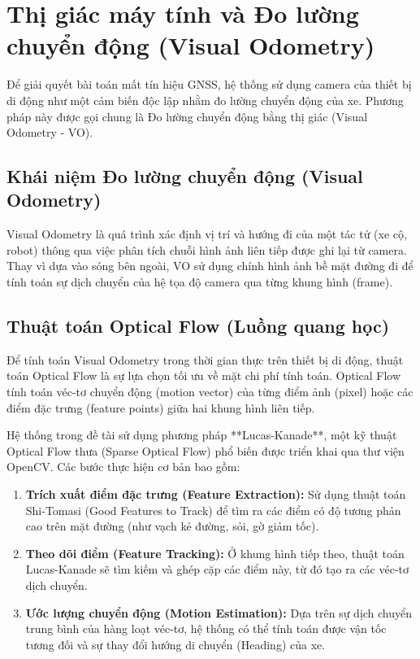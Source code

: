 \documentclass[../DoAn.tex]{subfiles}
\begin{document}
\section{Thị giác máy tính và Đo lường chuyển động (Visual Odometry)}
\label{section:2.2}

Để giải quyết bài toán mất tín hiệu GNSS, hệ thống sử dụng camera của thiết bị di động như một cảm biến độc lập nhằm đo lường chuyển động của xe. Phương pháp này được gọi chung là Đo lường chuyển động bằng thị giác (Visual Odometry - VO).

\subsection{Khái niệm Đo lường chuyển động (Visual Odometry)}
Visual Odometry là quá trình xác định vị trí và hướng đi của một tác tử (xe cộ, robot) thông qua việc phân tích chuỗi hình ảnh liên tiếp được ghi lại từ camera. Thay vì dựa vào sóng bên ngoài, VO sử dụng chính hình ảnh bề mặt đường đi để tính toán sự dịch chuyển của hệ tọa độ camera qua từng khung hình (frame).

\subsection{Thuật toán Optical Flow (Luồng quang học)}
Để tính toán Visual Odometry trong thời gian thực trên thiết bị di động, thuật toán Optical Flow là sự lựa chọn tối ưu về mặt chi phí tính toán. Optical Flow tính toán véc-tơ chuyển động (motion vector) của từng điểm ảnh (pixel) hoặc các điểm đặc trưng (feature points) giữa hai khung hình liên tiếp.

Hệ thống trong đề tài sử dụng phương pháp **Lucas-Kanade**, một kỹ thuật Optical Flow thưa (Sparse Optical Flow) phổ biến được triển khai qua thư viện OpenCV. Các bước thực hiện cơ bản bao gồm:
\begin{enumerate}
    \item \textbf{Trích xuất điểm đặc trưng (Feature Extraction):} Sử dụng thuật toán Shi-Tomasi (Good Features to Track) để tìm ra các điểm có độ tương phản cao trên mặt đường (như vạch kẻ đường, sỏi, gờ giảm tốc).
    \item \textbf{Theo dõi điểm (Feature Tracking):} Ở khung hình tiếp theo, thuật toán Lucas-Kanade sẽ tìm kiếm và ghép cặp các điểm này, từ đó tạo ra các véc-tơ dịch chuyển.
    \item \textbf{Ước lượng chuyển động (Motion Estimation):} Dựa trên sự dịch chuyển trung bình của hàng loạt véc-tơ, hệ thống có thể tính toán được vận tốc tương đối và sự thay đổi hướng di chuyển (Heading) của xe.
\end{enumerate}
\end{document}
